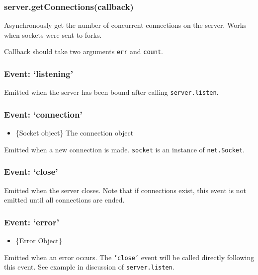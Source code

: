 \subsubsection{server.getConnections(callback)}\label{server.getconnectionscallback}

Asynchronously get the number of concurrent connections on the server.
Works when sockets were sent to forks.

Callback should take two arguments \texttt{err} and \texttt{count}.

\subsubsection{Event: `listening'}\label{event-listening}

Emitted when the server has been bound after calling
\texttt{server.listen}.

\subsubsection{Event: `connection'}\label{event-connection}

\begin{itemize}
\itemsep1pt\parskip0pt
\item
  \{Socket object\} The connection object
\end{itemize}

Emitted when a new connection is made. \texttt{socket} is an instance of
\texttt{net.Socket}.

\subsubsection{Event: `close'}\label{event-close}

Emitted when the server closes. Note that if connections exist, this
event is not emitted until all connections are ended.

\subsubsection{Event: `error'}\label{event-error}

\begin{itemize}
\itemsep1pt\parskip0pt
\item
  \{Error Object\}
\end{itemize}

Emitted when an error occurs. The \texttt{'close'} event will be called
directly following this event. See example in discussion of
\texttt{server.listen}.

